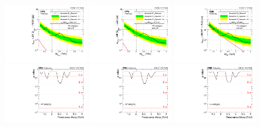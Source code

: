 \begin{figure}[h!]
\centering
\includegraphics[width=0.32\textwidth]{figures/analysis/search1/AN-15-211/limits/brazilianFlag_BulkWW_old_combined_13TeV_wPDF.pdf}
\includegraphics[width=0.32\textwidth]{figures/analysis/search1/AN-15-211/limits/brazilianFlag_BulkZZ_old_combined_13TeV_wPDF.pdf}
\includegraphics[width=0.32\textwidth]{figures/analysis/search1/AN-15-211/limits/brazilianFlag_WZ_old_combined_13TeV_wPDF.pdf}\\
\includegraphics[width=0.32\textwidth]{figures/analysis/search1/AN-15-211/pvalues/pvalue_BulkWWin_combined_old.pdf}
\includegraphics[width=0.32\textwidth]{figures/analysis/search1/AN-15-211/pvalues/pvalue_BulkZZin_combined_old.pdf}
\includegraphics[width=0.32\textwidth]{figures/analysis/search1/AN-15-211/pvalues/pvalue_WZin_combined_old.pdf}


\end{figure}
